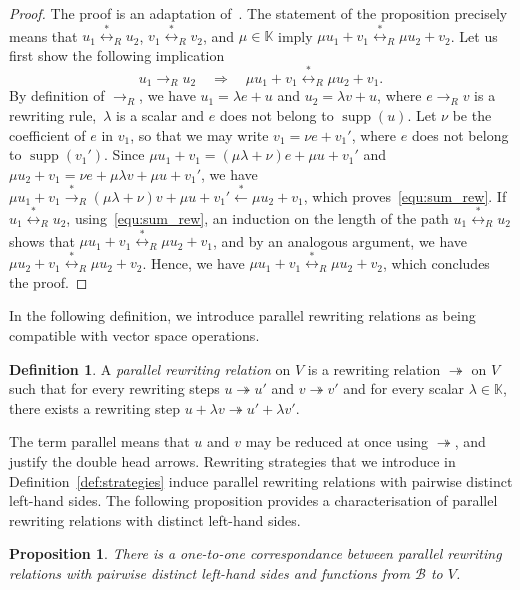 \documentclass[11pt]{article}
\newtheorem{proposition}[theorem]{Proposition}
\theoremstyle{definition}
\newtheorem{definition}[theorem]{Definition}
\newcommand\basis{\mathscr{B}}
\DeclareMathOperator{\supp}{supp}
\newcommand\K{\mathbb{K}}
\newcommand\rewR{\to_R}
\newcommand\parRew{\twoheadrightarrow}
\newcommand\transR{\overset{*}{\to}_R}
\newcommand\equivR{\overset{*}{\leftrightarrow}_R}
\begin{document}
\begin{proof}
  The proof is an adaptation
  of~\cite[Lemma 3.1.3]{GuiraudHoffbeckMalbos19}. The statement of the
  proposition precisely means that $u_1\equivR u_2$, $v_1\equivR v_2$,
  and $\mu\in\K$ imply $\mu u_1+ v_1\equivR\mu u_2+v_2$. Let us first
  show the following implication
  \begin{equation}\label{equ:sum_rew}
    u_1\rewR u_2\quad\Rightarrow\quad\mu u_1+v_1\equivR\mu u_2+v_1.
  \end{equation}
  By
  definition of $\rewR$, we have $u_1=\lambda e+u$ and $u_2=\lambda v+u$,
  where $e\rewR v$ is a rewriting rule,~$\lambda$ is a scalar and $e$
  does not belong to $\supp(u)$. Let $\nu$ be the coefficient of $e$ in
  $v_1$, so that we may write $v_1=\nu e+v_1'$, where $e$ does not belong
  to $\supp(v_1')$. Since $\mu u_1+v_1=(\mu\lambda+\nu)e+\mu u+v_1'$ and
  $\mu u_2+v_1=\nu e+\mu\lambda v +\mu u+v_1'$, we have $\mu u_1+v_1
  \transR(\mu\lambda+\nu)v+\mu u+v_1'\overset{*}{\leftarrow}\mu u_2+v_1$,
  which proves~\eqref{equ:sum_rew}. If $u_1\equivR u_2$,
  using~\eqref{equ:sum_rew}, an induction on the length of the path
  $u_1\equivR u_2$ shows that $\mu u_1+v_1\equivR\mu u_2+v_1$, and by an
  analogous argument, we have $\mu u_2+v_1\equivR\mu u_2+v_2$. Hence, we
  have $\mu u_1+v_1\equivR\mu u_2+v_2$, which concludes the proof.
\end{proof}
\smallskip

In the following definition, we introduce parallel rewriting relations as
being compatible with vector space operations.
\smallskip

\begin{definition}
  A {\em parallel rewriting relation} on $V$ is a rewriting relation
  $\parRew$ on $V$ such that for every rewriting steps $u\parRew u'$ and
  $v\parRew v'$ and for every scalar $\lambda\in\K$, there exists a 
  rewriting step $u+\lambda v\parRew u'+\lambda v'$.
\end{definition}

The term parallel means that $u$ and $v$ may be reduced at once using
$\parRew$, and justify the double head arrows. Rewriting strategies that
we introduce in Definition~\ref{def:strategies} induce parallel rewriting
relations with pairwise distinct left-hand sides. The following
proposition provides a characterisation of parallel rewriting relations
with distinct left-hand sides. 
\smallskip

\begin{proposition}\label{prop:parRew_function}
  There is a one-to-one correspondance between parallel rewriting
  relations with pairwise distinct left-hand sides and functions from
  $\basis$ to $V$.
\end{proposition}
\end{document}
